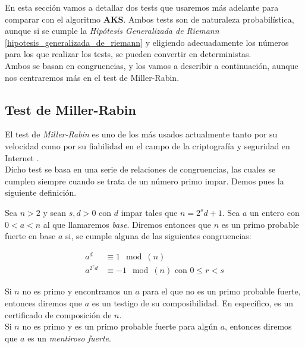 En esta sección vamos a detallar dos tests que usaremos más adelante para comparar con el algoritmo \textbf{AKS}. Ambos tests son de naturaleza probabilística, aunque si se cumple la \textit{Hipótesis Generalizada de Riemann} \ref{hipotesis_generalizada_de_riemann} y eligiendo adecuadamente los números para los que realizar los tests, se pueden convertir en deterministas.\\

Ambos se basan en congruencias, y los vamos a describir a continuación, aunque nos centraremos más en el test de Miller-Rabin.

\subsection{Test de Miller-Rabin}

El test de \textit{Miller-Rabin} es uno de los más usados actualmente tanto por su velocidad como por su fiabilidad en el campo de la criptografía y seguridad en Internet \cite{digital_signature_standard}.\\

Dicho test se basa en una serie de relaciones de congruencias, las cuales se cumplen siempre cuando se trata de un número primo impar. Demos pues la siguiente definición.\\

\begin{definicion}
	Sea $n > 2$ y sean $s, d > 0$ con $d$ impar tales que $n = 2^s d + 1$. Sea $a$ un entero con $0 < a < n$ al que llamaremos \textit{base}. Diremos entonces que $n$ es un primo probable fuerte en base $a$ si, se cumple alguna de las siguientes congruencias:
	
	\begin{align}\label{congruencias_miller_rabin}
	a^d &\equiv 1 \mod(n)\\
	a^{2^r d} &\equiv -1 \mod(n)\text{ con $0 \leq r < s$}
	\end{align}
\end{definicion}

Si $n$ no es primo y encontramos un $a$ para el que no es un primo probable fuerte, entonces diremos que $a$ es un testigo de su composibilidad. En específico, es un certificado de composición de $n$.\\

Si $n$ no es primo y es un primo probable fuerte para algún $a$, entonces diremos que $a$ es un \textit{mentiroso fuerte}.\\

